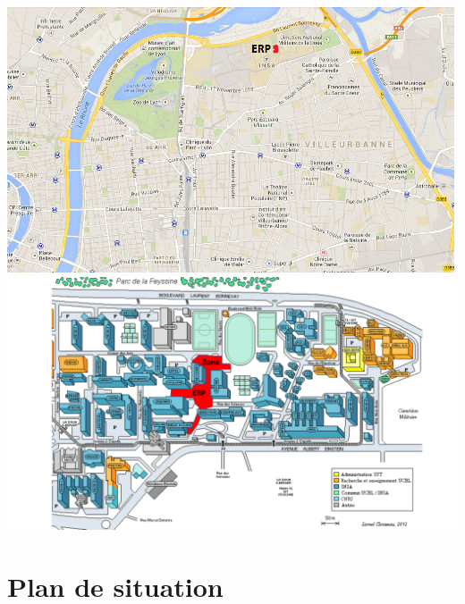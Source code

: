 \documentclass[hidelinks, paper=a4, fontsize=13pt]{report}
\begin{document}
\begin{center}
	\includegraphics[width=.8\textwidth,keepaspectratio]{Annexes/Images/plandemasse}
	\vspace{5mm}
	\includegraphics[width=\textwidth,keepaspectratio, angle=90]{Annexes/Exports/Plan_du_campus}
\end{center}

\section{Plan de situation}
\end{document}
